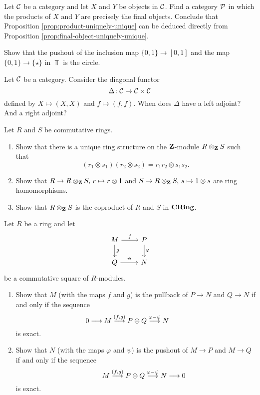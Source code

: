 \begin{exercise}\label{exc:product-as-final-object}
Let ${\mathcal{C}}$ be a category and let $X$ and $Y$ be objects in ${\mathcal{C}}$. Find a category ${\mathcal{P}}$ in which the products of $X$ and $Y$ are precisely the final objects. Conclude that Proposition \ref{prop:product-uniquely-unique} can be deduced directly from Proposition  \ref{prop:final-object-uniquely-unique}.
\end{exercise}


\begin{exercise}
Show that the pushout of the inclusion map $\{0,1\} \to [0,1]$ and the map $\{0,1\} \to \{\star\}$ in $\Top$ is the circle.
\end{exercise}

\begin{exercise}
Let ${\mathcal{C}}$ be a category. Consider the diagonal functor 
\[
	\Delta\colon {\mathcal{C}} \to {\mathcal{C}} \times {\mathcal{C}}
\]
defined by $X\mapsto (X,X)$ and $f\mapsto (f,f)$. When does $\Delta$ have a left adjoint? And a right adjoint?
\end{exercise}


\begin{exercise}
Let $R$ and $S$ be commutative rings.
\begin{enumerate}
\item Show that there is a unique ring structure on the ${\mathbf{Z}}$-module $R\otimes_{\mathbf{Z}} S$ such that
\[
	(r_1 \otimes s_1)(r_2\otimes s_2) = r_1 r_2 \otimes s_1s_2.
\]
\item Show that $R\to R\otimes_{\mathbf{Z}} S,\, r \mapsto r \otimes 1$ and
$S\to R\otimes_{\mathbf{Z}} S,\, s \mapsto 1 \otimes s$ are ring homomorphisms.
\item Show that $R\otimes_{\mathbf{Z}} S$ is the coproduct of $R$ and $S$ in $\mathbf{CRing}$. 
\end{enumerate}
\end{exercise}


\begin{exercise}\label{exc:module-pushout}
Let $R$ be a ring and let
\[
\begin{tikzcd}
	M \arrow{r}{f} \arrow{d}{g} & P \arrow{d}{\varphi} \\
	Q \arrow{r}{\psi} & N 
\end{tikzcd}
\]
be a commutative square of $R$-modules. 
\begin{enumerate}
\item Show that $M$ (with the maps $f$ and $g$) is the pullback of $P\to N$ and $Q\to N$ if and only if the sequence
\[
	0 \longto M \overset{(f,g)}{\longto} P \oplus Q \overset{\varphi-\psi}{\longto} N
	\phantom{\longto 0}
\]
is exact.
\item Show that $N$ (with the maps $\varphi$ and $\psi$) is the pushout of $M\to P$ and $M\to Q$ if and only if the sequence
\[
	\phantom{0\longto} M \overset{(f,g)}{\longto} P \oplus Q \overset{\varphi-\psi}{\longto} N \longto 0
\]
is exact.
\end{enumerate}

\end{exercise}


